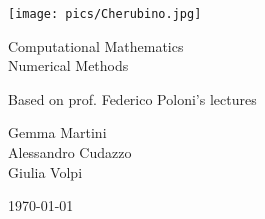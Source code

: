 \documentclass[computationalMathematics.tex]{subfiles}
\begin{document}
\begin{titlepage}
    \begin{center}
    \vspace{3cm}
    
    \Large
    
    \vspace{2cm}
    
    \texttt{[image: pics/Cherubino.jpg]}
    
    \vspace{2.5cm}
    
    {\Huge \sc Computational Mathematics\\ Numerical Methods}
    
    \vspace{2cm}
    Based on prof. Federico Poloni's lectures
    
    \vspace{2cm}
    Gemma Martini\\ Alessandro Cudazzo\\ Giulia Volpi
    \vfill
    
    \today
    
    \end{center}
\end{titlepage}

\shipout\null

\tableofcontents
\let\tableofcontents\relax

\newpage



\newpage



\newpage



\newpage



\newpage



\newpage



\newpage



\newpage



\newpage



\newpage



\newpage



\newpage



\newpage



\newpage



\newpage



\newpage


\end{document}
